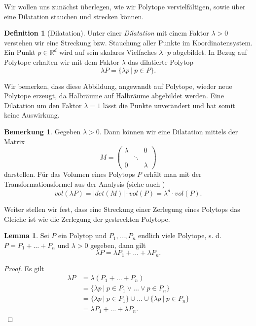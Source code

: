 \documentclass[11pt,titlepage]{article}
\newcommand{\setR}{\mathbb{R}}
\newcommand{\abs}[1]{{\left| #1 \right|}}
\theoremstyle{definition}
\newtheorem{lemma}[theorem]{Lemma}
\newtheorem{definition}[theorem]{Definition}
\newtheorem{remark}[theorem]{Bemerkung}
\theoremstyle{remark}
\begin{document}
	Wir wollen uns zunächst überlegen, wie wir Polytope vervielfältigen, sowie 
	über eine Dilatation stauchen und strecken können. 
	
	\begin{definition}[Dilatation]
		Unter einer \textsl{Dilatation} mit einem Faktor $\lambda>0$ 
		verstehen wir eine Streckung bzw. Stauchung aller Punkte 
		im Koordinatensystem. Ein Punkt $p\in\setR^d$ wird auf 
		sein skalares Vielfaches $\lambda\cdot p$ abgebildet. In Bezug auf 
		Polytope erhalten wir mit dem Faktor $\lambda$ das dilatierte Polytop 
		\[\lambda P=\{\lambda p\ \vert\ p\in P\}.\]
	\end{definition}
	
	Wir bemerken, dass diese Abbildung, angewandt auf Polytope, wieder neue 
	Polytope erzeugt, da Halbräume auf Halbräume abgebildet werden. 
	Eine Dilatation um den Faktor $\lambda=1$ lässt die Punkte unverändert und 
	hat somit keine Auswirkung. 
	
	\begin{remark}\label{bem:dilvol}
		Gegeben $\lambda >0$. Dann können wir eine Dilatation mittels der Matrix
		\[M=\begin{pmatrix}
		\lambda &\ & 0\\
		\ &\ddots &\ \\
		0 &\ &\lambda
		\end{pmatrix}\] 
		darstellen. Für das Volumen eines Polytops $P$ erhält man mit 
		der Transformationsformel aus der Analysis (siehe auch \cite[Satz 4.7]{SkriptAna3})
		\[vol(\lambda P)=\abs{det(M)}\cdot vol(P)=\lambda^d\cdot vol(P).\]
	\end{remark}
	
	Weiter stellen wir fest, dass eine Streckung einer Zerlegung eines 
	Polytops das Gleiche ist wie die Zerlegung der gestreckten Polytope.
	
	\begin{lemma} \label{lemma:dilzerl}
		Sei $P$ ein Polytop und $P_1,\ldots,P_n$ endlich viele Polytope, s. d. 
		$P=P_1+\ldots+P_n$ und $\lambda>0$ gegeben, dann gilt 
		\[\lambda P=\lambda P_1+\ldots+\lambda P_n.\]
	\end{lemma}
	
	\begin{proof}
		Es gilt
		\begin{align*}
			\lambda P&=\lambda(P_1+\ldots+P_n)\\
			&=\{\lambda p\ \vert\ p\in P_1 	\lor\ldots\lor p\in P_n\}\\
			&=\{\lambda p\ \vert\ p\in P_1\}\cup\ldots\cup
			\{\lambda p\ \vert\ p\in P_n\}\\
			&=\lambda P_1 +\ldots+\lambda P_n.
		\end{align*}
	\end{proof}
	
\end{document}
